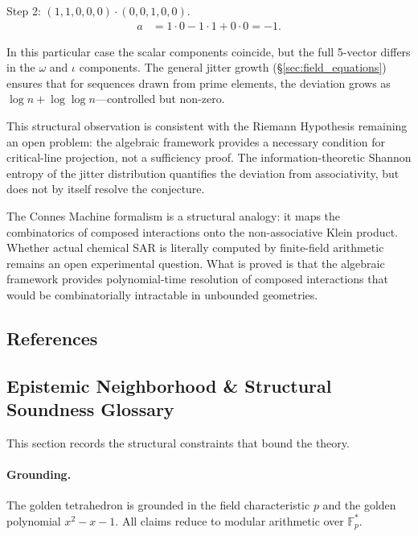 Step 2: $(1, 1, 0, 0, 0) \cdot (0, 0, 1, 0, 0)$.
\begin{align}
a &= 1 \cdot 0 - 1 \cdot 1 + 0 \cdot 0 = -1.
\end{align}

In this particular case the scalar components coincide, but the
full 5-vector differs in the $\omega$ and $\iota$ components.
The general jitter growth (\S\ref{sec:field_equations}) ensures
that for sequences drawn from prime elements, the deviation
grows as $\log n + \log\log n$---controlled but non-zero.

This structural observation is consistent with the Riemann Hypothesis remaining an open problem: the algebraic framework provides a necessary condition for critical-line projection, not a sufficiency proof. The information-theoretic Shannon entropy of the jitter distribution quantifies the deviation from associativity, but does not by itself resolve the conjecture.

\begin{remark}
The Connes Machine formalism is a structural analogy: it maps
the combinatorics of composed interactions onto the non-associative
Klein product. Whether actual chemical SAR is literally computed
by finite-field arithmetic remains an open experimental question.
What is proved is that the algebraic framework provides
polynomial-time resolution of composed interactions that would
be combinatorially intractable in unbounded geometries.
\end{remark}


\subsection*{References}



\subsection*{Epistemic Neighborhood \& Structural Soundness Glossary}

This section records the structural constraints that bound the theory.

\paragraph{Grounding.} The golden tetrahedron is grounded in the field characteristic $p$ and the golden polynomial $x^2 - x - 1$. All claims reduce to modular arithmetic over $\mathbb{F}_p^*$.

